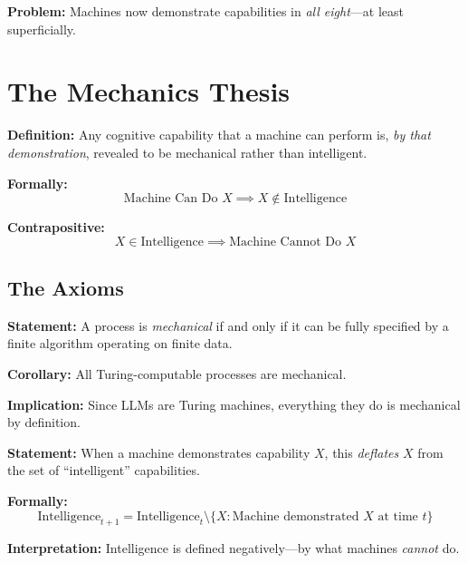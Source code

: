 \textbf{Problem:} Machines now demonstrate capabilities in \textit{all eight}---at least superficially.


\section{The Mechanics Thesis}
\label{sec:hi-mechanics}

\begin{tcolorbox}[colback=red!5!white, colframe=red!75!black,
    title=The Mechanics Thesis]
\textbf{Definition:} Any cognitive capability that a machine can perform is, \textit{by that demonstration}, revealed to be mechanical rather than intelligent.

\textbf{Formally:}
\begin{equation}
\text{Machine Can Do } X \implies X \notin \text{Intelligence}
\end{equation}

\textbf{Contrapositive:}
\begin{equation}
X \in \text{Intelligence} \implies \text{Machine Cannot Do } X
\end{equation}
\end{tcolorbox}

\subsection{The Axioms}

\begin{tcolorbox}[colback=gray!5!white, colframe=gray!75!black,
    title=Axiom HI-1: Mechanizability Criterion]
\textbf{Statement:} A process is \textit{mechanical} if and only if it can be fully specified by a finite algorithm operating on finite data.

\textbf{Corollary:} All Turing-computable processes are mechanical.

\textbf{Implication:} Since LLMs are Turing machines, everything they do is mechanical by definition.
\end{tcolorbox}

\begin{tcolorbox}[colback=gray!5!white, colframe=gray!75!black,
    title=Axiom HI-2: Demonstration Deflates]
\textbf{Statement:} When a machine demonstrates capability $X$, this \textit{deflates} $X$ from the set of ``intelligent'' capabilities.

\textbf{Formally:}
\begin{equation}
\text{Intelligence}_{t+1} = \text{Intelligence}_t \setminus \{X : \text{Machine demonstrated } X \text{ at time } t\}
\end{equation}

\textbf{Interpretation:} Intelligence is defined negatively---by what machines \textit{cannot} do.
\end{tcolorbox}

